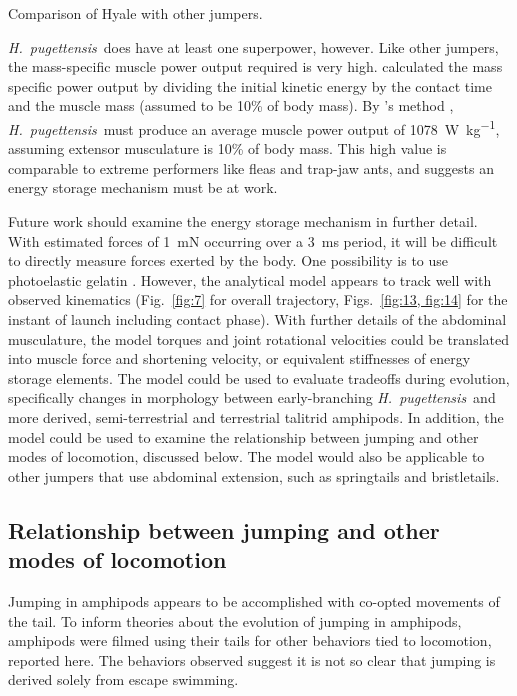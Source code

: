 \documentclass{article}
\newcommand{\Genus}[1]{\emph{#1}}
\newcommand{\Hyale}{\Genus{H.~pugettensis}}
\begin{document}
\begin{table}
\caption{Comparison of Hyale with other jumpers.}
\label{table:6}
\end{table}
	
\Hyale\ does have at least one superpower, however.  Like other jumpers, the mass-specific muscle power output required is very high.  \citet{Bennet-Clark:1975} calculated the mass specific power output by dividing the initial kinetic energy by the contact time and the muscle mass (assumed to be 10\% of body mass).  By \citeauthor{Bennet-Clark:1975}'s method \citeyear{Bennet-Clark:1975}, \Hyale\ must produce an average muscle power output of \SI{1078}{\watt\per\kilo\gram}, assuming extensor musculature is 10\% of body mass.  This high value is comparable to extreme performers like fleas and trap-jaw ants, and suggests an energy storage mechanism must be at work.  
	
Future work should examine the energy storage mechanism in further detail.  With estimated forces of \SI{1}{\milli\newton} occurring over a \SI{3}{\milli\second} period, it will be difficult to directly measure forces exerted by the body.  One possibility is to use photoelastic gelatin \citep{Full:1995}.   However, the analytical model appears to track well with observed kinematics (Fig.~\ref{fig:7} for overall trajectory, Figs.~\ref{fig:13, fig:14} for the instant of launch including contact phase).  With further details of the abdominal musculature, the model torques and joint rotational velocities could be translated into muscle force and shortening velocity, or equivalent stiffnesses of energy storage elements.  The model could be used to evaluate tradeoffs during evolution, specifically changes in morphology between early-branching \Hyale\ and more derived, semi-terrestrial and terrestrial talitrid amphipods.  In addition, the model could be used to examine the relationship between jumping and other modes of locomotion, discussed below.  The model would also be applicable to other jumpers that use abdominal extension, such as springtails and bristletails. 
	
\subsection*{Relationship between jumping and other modes of locomotion}
Jumping in amphipods appears to be accomplished with co-opted movements of the tail.  To inform theories about the evolution of jumping in amphipods, amphipods were filmed using their tails for other behaviors tied to locomotion, reported here.  The behaviors observed suggest it is not so clear that jumping is derived solely from escape swimming. 
	
\end{document}
